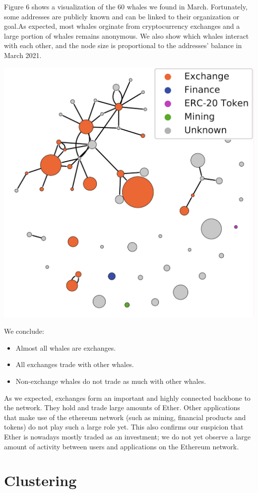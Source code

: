 \documentclass[10pt,a4paper]{article}
\newenvironment{Figure}
  {\par\medskip\noindent\minipage{\linewidth}}
  {\endminipage\par\medskip}
\begin{document}
\begin{multicols}{2}
Figure 6 shows a visualization of the 60 whales we found in March. Fortunately, some addresses are publicly known and can be linked to their organization or goal.As expected, most whales orginate from cryptocurrency exchanges and a large portion of whales remains anonymous. We also show which whales interact with each other, and the node size is proportional to the addresses' balance in March 2021. 

\vspace{5pt}
\begin{Figure}
\centering
\includegraphics[scale=0.23]{figures/whales.pdf}
\label{whales}
\end{Figure}

We conclude:
\begin{itemize}
\item{Almost all whales are exchanges.}
\item{All exchanges trade with other whales.}
\item{Non-exchange whales do not trade as much with other whales.}
\end{itemize}

As we expected, exchanges form an important and highly connected backbone to the network. They hold and trade large amounts of Ether. Other applications that make use of the ethereum network (such as mining, financial products and tokens) do not play such a large role yet. This also confirms our suspicion that Ether is nowadays mostly traded as an investment; we do not yet observe a large amount of activity between users and applications on the Ethereum network.

\section{Clustering}
\end{multicols}


\end{document}
